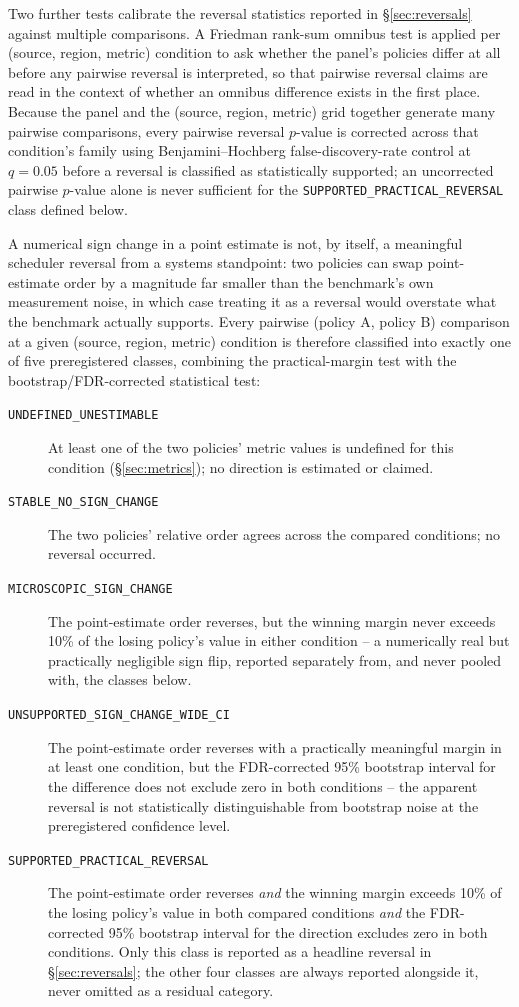 \documentclass[sn-basic,Numbered,pdflatex]{sn-jnl}
\begin{document}
Two further tests calibrate the reversal statistics reported in
\S\ref{sec:reversals} against multiple comparisons. A Friedman rank-sum
omnibus test is applied per (source, region, metric) condition to ask
whether the panel's policies differ at all before any pairwise reversal is
interpreted, so that pairwise reversal claims are read in the context of
whether an omnibus difference exists in the first place. Because the panel
and the (source, region, metric) grid together generate many pairwise
comparisons, every pairwise reversal $p$-value is corrected across that
condition's family using Benjamini--Hochberg false-discovery-rate control
at $q = 0.05$ before a reversal is classified as statistically supported;
an uncorrected pairwise $p$-value alone is never sufficient for the
\texttt{SUPPORTED\_PRACTICAL\_REVERSAL} class defined below.

A numerical sign change in a point estimate is not, by itself, a meaningful
scheduler reversal from a systems standpoint: two policies can swap
point-estimate order by a magnitude far smaller than the benchmark's own
measurement noise, in which case treating it as a reversal would overstate
what the benchmark actually supports. Every pairwise (policy A, policy B)
comparison at a given (source, region, metric) condition is therefore
classified into exactly one of five preregistered classes, combining the
practical-margin test with the bootstrap/FDR-corrected statistical test:

\begin{description}
  \item[\texttt{UNDEFINED\_UNESTIMABLE}] At least one of the two policies'
    metric values is undefined for this condition (\S\ref{sec:metrics});
    no direction is estimated or claimed.
  \item[\texttt{STABLE\_NO\_SIGN\_CHANGE}] The two policies' relative order
    agrees across the compared conditions; no reversal occurred.
  \item[\texttt{MICROSCOPIC\_SIGN\_CHANGE}] The point-estimate order
    reverses, but the winning margin never exceeds 10\% of the losing
    policy's value in either condition -- a numerically real but
    practically negligible sign flip, reported separately from, and never
    pooled with, the classes below.
  \item[\texttt{UNSUPPORTED\_SIGN\_CHANGE\_WIDE\_CI}] The point-estimate
    order reverses with a practically meaningful margin in at least one
    condition, but the FDR-corrected 95\% bootstrap interval for the
    difference does not exclude zero in both conditions -- the apparent
    reversal is not statistically distinguishable from bootstrap noise at
    the preregistered confidence level.
  \item[\texttt{SUPPORTED\_PRACTICAL\_REVERSAL}] The point-estimate order
    reverses \emph{and} the winning margin exceeds 10\% of the losing
    policy's value in both compared conditions \emph{and} the
    FDR-corrected 95\% bootstrap interval for the direction excludes zero
    in both conditions. Only this class is reported as a headline reversal
    in \S\ref{sec:reversals}; the other four classes are always reported
    alongside it, never omitted as a residual category.
\end{description}
\end{document}
